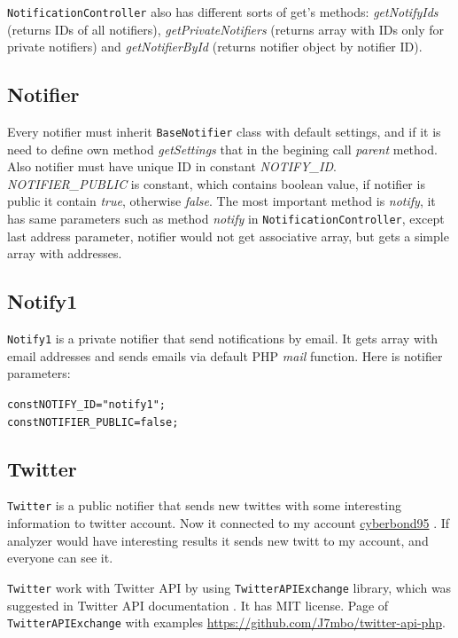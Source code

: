 \texttt{NotificationController} also has different sorts of get's methods: \emph{getNotifyIds} (returns IDs of all notifiers), \emph{getPrivateNotifiers} (returns array with IDs only for private notifiers) and \emph{getNotifierById} (returns notifier object by notifier ID).

\subsection{Notifier}

Every notifier must inherit \texttt{BaseNotifier} class with default settings, and if it is need to define own method \emph{getSettings} that in the begining call \emph{parent} method. Also notifier must have unique ID in constant \emph{NOTIFY\_ID}. \emph{NOTIFIER\_PUBLIC} is constant, which contains boolean value, if notifier is public it contain \emph{true}, otherwise \emph{false}. The most important method is \emph{notify}, it has same parameters such as method \emph{notify} in \texttt{NotificationController}, except last address parameter, notifier would not get associative array, but gets a simple array with addresses.

\subsection{Notify1}

\texttt{Notify1} is a private notifier that send notifications by email. It gets array with email addresses and sends emails via default PHP \emph{mail} function. Here is notifier parameters:

\begin{alltt}
const NOTIFY_ID = "notify1";
const NOTIFIER_PUBLIC = false;
\end{alltt}

\subsection{Twitter}

\texttt{Twitter} is a public notifier that sends new twittes with some interesting information to twitter account. Now it connected to my account \href{https://twitter.com/cyberbond95}{cyberbond95} . If analyzer would have interesting results it sends new twitt to my account, and everyone can see it.

\texttt{Twitter} work with Twitter API by using \texttt{TwitterAPIExchange} library, which was suggested in Twitter API documentation \cite{twitter}. It has MIT license. Page of \texttt{TwitterAPIExchange} with examples \url{https://github.com/J7mbo/twitter-api-php}.

